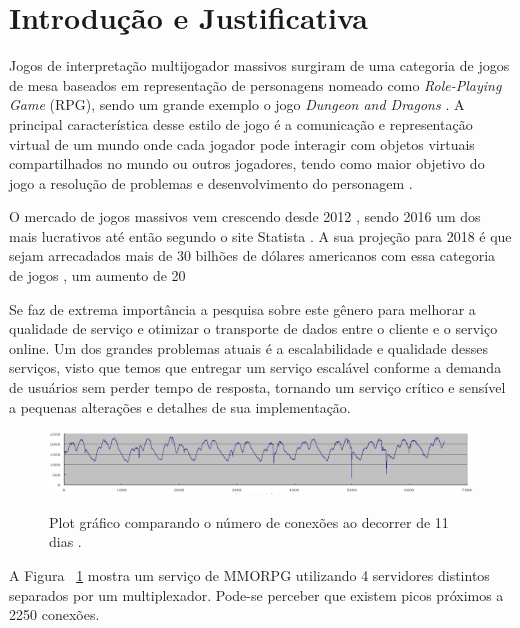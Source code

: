 \section{Introdução e Justificativa}
\label{sec:int}

Jogos de interpretação multijogador massivos surgiram de uma categoria de jogos de mesa baseados em representação de personagens nomeado como \textit{Role-Playing Game} (RPG), sendo um grande exemplo o jogo \textit{Dungeon and Dragons} \cite{tsr1980dungeons}. A principal característica desse estilo de jogo é a comunicação e representação virtual de um mundo onde cada jogador pode interagir com objetos virtuais compartilhados no mundo ou outros jogadores, tendo como maior objetivo do jogo a resolução de problemas e desenvolvimento do personagem \cite{video_game_technologies}.

O mercado de jogos massivos vem crescendo desde 2012 \cite{new_york_times}, sendo 2016 um dos mais lucrativos até então segundo o site Statista \cite{statista_2016}. A sua projeção para 2018 é que sejam arrecadados mais de 30 bilhões de dólares americanos com essa categoria de jogos \cite{statista_2018}, um aumento de 20%

Se faz de extrema importância a pesquisa sobre este gênero para melhorar a qualidade de serviço e otimizar o transporte de dados entre o cliente e o serviço online. Um dos grandes problemas atuais é a escalabilidade e qualidade desses serviços, visto que temos que entregar um serviço escalável conforme a demanda de usuários sem perder tempo de resposta, tornando um serviço crítico e sensível a pequenas alterações e detalhes de sua implementação.

\begin{figure}[h]
\caption{Plot gráfico comparando o número de conexões ao decorrer de 11 dias
\cite{system_performance}.}
\centering
\includegraphics[width=1\textwidth]{img/connection_peer_hour.png}
\label{fig:conection_peer_hour}
\end{figure}

A Figura ~\ref{fig:conection_peer_hour} mostra um serviço de MMORPG utilizando 4 servidores distintos separados por um multiplexador. Pode-se perceber que existem picos próximos a 2250 conexões.

